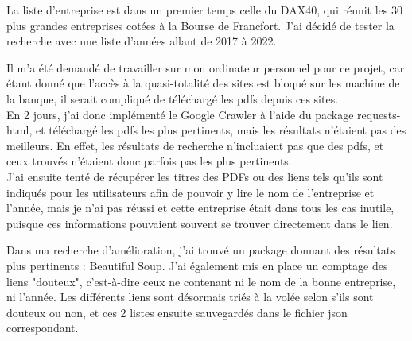 La liste d'entreprise est dans un premier temps celle du DAX40, qui réunit les 30 plus grandes entreprises cotées à la Bourse de Francfort.
J'ai décidé de tester la recherche avec une liste d'années allant de 2017 à 2022.

Il m'a été demandé de travailler sur mon ordinateur personnel pour ce projet, car étant donné que l'accès à la quasi-totalité des sites est bloqué sur les machine de la banque, il serait compliqué de téléchargé les pdfs depuis ces sites.
\\

En 2 jours, j'ai donc implémenté le Google Crawler à l'aide du package requests-html, et téléchargé les pdfs les plus pertinents, mais les résultats n'étaient pas des meilleurs. 
En effet, les résultats de recherche n'incluaient pas que des pdfs, et ceux trouvés n'étaient donc parfois pas les plus pertinents.
\\

J'ai ensuite tenté de récupérer les titres des PDFs ou des liens tels qu'ils sont indiqués pour les utilisateurs afin de pouvoir y lire le nom de l'entreprise et l'année, mais je n'ai pas réussi et cette entreprise était dans tous les cas inutile, puisque ces informations pouvaient souvent se trouver directement dans le lien.

Dans ma recherche d'amélioration, j'ai trouvé un package donnant des résultats plus pertinents : Beautiful Soup.
J'ai également mis en place un comptage des liens "douteux", c'est-à-dire ceux ne contenant ni le nom de la bonne entreprise, ni l'année.
Les différents liens sont désormais triés à la volée selon s'ils sont douteux ou non, et ces 2 listes ensuite sauvegardés dans le fichier json correspondant.
\\

